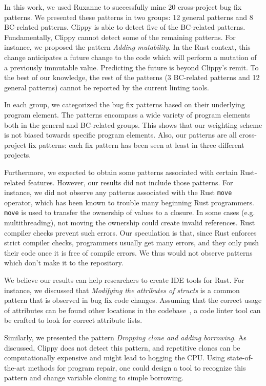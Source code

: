 In this work, we used Ruxanne to successfully mine 20 cross-project bug fix patterns. We presented these patterns in two groups: 12 general patterns and 8 BC-related patterns. Clippy is able to detect five of the BC-related patterns. Fundamentally, Clippy cannot detect some of the remaining patterns. For instance, we proposed the pattern \textit{Adding mutability}. In the Rust context, this change anticipates a future change to the code which will perform a mutation of a previously immutable value. Predicting the future is beyond Clippy's remit. To the best of our knowledge, the rest of the patterns (3 BC-related patterns and 12 general patterns) cannot be reported by the current linting tools. 

In each group, we categorized the bug fix patterns based on their underlying program element. The patterns encompass a wide variety of program elements both in the general and BC-related groups. This shows that our weighting scheme is not biased towards specific program elements. Also, our patterns are all cross-project fix patterns: each fix pattern has been seen at least in three different projects.

Furthermore, we expected to obtain some patterns associated with certain Rust-related features. However, our results did not include those patterns. For instance, we did not observe any patterns associated with the Rust \verb+move+ operator, which has been known to trouble many beginning Rust programmers. \verb+move+ is used to transfer the ownership of values to a closure. In some cases (e.g. multithreading), not moving the ownership could create invalid references. Rust compiler checks prevent such errors. Our speculation is that, since Rust enforces strict compiler checks, programmers usually get many errors, and they only push their code once it is free of compile errors. We thus would not observe patterns which don't make it to the repository.

We believe our results can help researchers to create IDE tools for Rust. For instance, we discussed that \textit{Modifying the attributes of structs} is a common pattern that is observed in bug fix code changes. Assuming that the correct usage of attributes can be found other locations in the codebase~\citep{forrest2009genetic}, a code linter tool can be crafted to look for correct attribute lists.

Similarly, we presented the pattern \textit{Dropping clone and adding borrowing}. As discussed, Clippy does not detect this pattern, and repetitive clones can be computationally expensive and might lead to hogging the CPU. Using state-of-the-art methods for program repair, one could design a tool to recognize this pattern and change variable cloning to simple borrowing.

